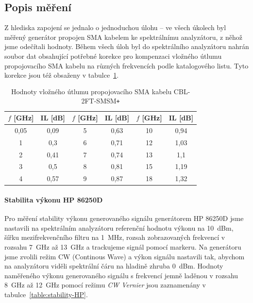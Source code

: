 \documentclass[11pt,a4paper]{article}
\newcommand{\plus}{{\texttt{+}}}
\begin{document}
\subsection*{Popis měření}
Z hlediska zapojení se jednalo o jednoduchou úlohu -- ve všech úkolech byl měřený generátor propojen SMA kabelem ke spektrálnímu analyzátoru, z něhož jsme odečítali hodnoty. Během všech úloh byl do spektrálního analyzátoru nahrán soubor dat obsahující potřebné korekce pro kompenzaci vložného útlumu propojovacího SMA kabelu na různých frekvencích podle katalogového listu. Tyto korekce jsou též obsaženy v tabulce~\ref{table:cable-CBL2FTSMSM-insertion-loss}.

\begin{table}[!ht]
\begin{center}
\begin{tabular}{| c | c || c | c || c | c |}
    \hline
    $f$ [GHz] & IL [dB] & $f$ [GHz] & IL [dB] & $f$ [GHz] & IL [dB] \\
    \hline
    0,05 & 0,09 & 5 & 0,63 & 10 & 0,94 \\
    \hline
    1 & 0,3 & 6 & 0,71 & 12 & 1,03 \\
    \hline
    2 & 0,41 & 7 & 0,74 & 13 & 1,1 \\
    \hline
    3 & 0,5 & 8 & 0,81 & 15 & 1,19 \\
    \hline
    4 & 0,57 & 9 & 0,87 & 18 & 1,32 \\
    \hline
\end{tabular}
\caption{Hodnoty vložného útlumu propojovacího SMA kabelu CBL-2FT-SMSM\plus}
\label{table:cable-CBL2FTSMSM-insertion-loss}
\end{center}
\end{table}

\paragraph*{Stabilita výkonu HP 86250D} Pro měření stability výkonu generovaného signálu generátorem HP 86250D jsme nastavili na spektrálním analyzátoru referenční hodnotu výkonu na 10~dBm, šířku mezifrekvenčního filtru na 1~MHz, rozsah zobrazovaných frekvencí v rozsahu 7~GHz až 13~GHz a trackujeme signál pomocí markeru. Na generátoru jsme zvolili režim CW (Continous Wave) a výkon signálu nastavili tak, abychom na analyzátoru viděli spektrální čáru na hladině zhruba 0~dBm. Hodnoty naměřeného výkonu generovaného signálu s frekvencí jemně laděnou v rozsahu 8~GHz až 12~GHz pomocí režimu \emph{CW Vernier} jsou zaznamenány v tabulce~\ref{table:stability-HP}.
\end{document}
